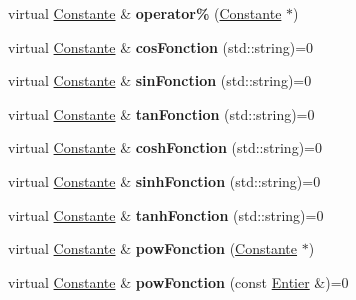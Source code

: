 \begin{DoxyCompactItemize}
\item 
\hypertarget{class_constante_a9234f524cc1b97560236afe686c4767a}{virtual \hyperlink{class_constante}{Constante} \& {\bfseries operator\%} (\hyperlink{class_constante}{Constante} $\ast$)}\label{class_constante_a9234f524cc1b97560236afe686c4767a}

\item 
\hypertarget{class_constante_a62ac7c7b4f04706ef930728736ee45ae}{virtual \hyperlink{class_constante}{Constante} \& {\bfseries cos\-Fonction} (std\-::string)=0}\label{class_constante_a62ac7c7b4f04706ef930728736ee45ae}

\item 
\hypertarget{class_constante_adf047fc87a4bc192ca159ad1711effb2}{virtual \hyperlink{class_constante}{Constante} \& {\bfseries sin\-Fonction} (std\-::string)=0}\label{class_constante_adf047fc87a4bc192ca159ad1711effb2}

\item 
\hypertarget{class_constante_ac527584889c9865e0dc80e4c22f6fc73}{virtual \hyperlink{class_constante}{Constante} \& {\bfseries tan\-Fonction} (std\-::string)=0}\label{class_constante_ac527584889c9865e0dc80e4c22f6fc73}

\item 
\hypertarget{class_constante_ae0bf50b47928dc108de2f29231aefbeb}{virtual \hyperlink{class_constante}{Constante} \& {\bfseries cosh\-Fonction} (std\-::string)=0}\label{class_constante_ae0bf50b47928dc108de2f29231aefbeb}

\item 
\hypertarget{class_constante_adbdbe6e979fcdf68d2c38c8114d0dde6}{virtual \hyperlink{class_constante}{Constante} \& {\bfseries sinh\-Fonction} (std\-::string)=0}\label{class_constante_adbdbe6e979fcdf68d2c38c8114d0dde6}

\item 
\hypertarget{class_constante_a79f9e32d8dfe2980f9ad17733d5905fb}{virtual \hyperlink{class_constante}{Constante} \& {\bfseries tanh\-Fonction} (std\-::string)=0}\label{class_constante_a79f9e32d8dfe2980f9ad17733d5905fb}

\item 
\hypertarget{class_constante_a6218e67aef6b06f29d37b112206d56c6}{virtual \hyperlink{class_constante}{Constante} \& {\bfseries pow\-Fonction} (\hyperlink{class_constante}{Constante} $\ast$)}\label{class_constante_a6218e67aef6b06f29d37b112206d56c6}

\item 
\hypertarget{class_constante_a4de24bbfec26b381782d54f86699f5db}{virtual \hyperlink{class_constante}{Constante} \& {\bfseries pow\-Fonction} (const \hyperlink{class_entier}{Entier} \&)=0}\label{class_constante_a4de24bbfec26b381782d54f86699f5db}


\end{DoxyCompactItemize}
